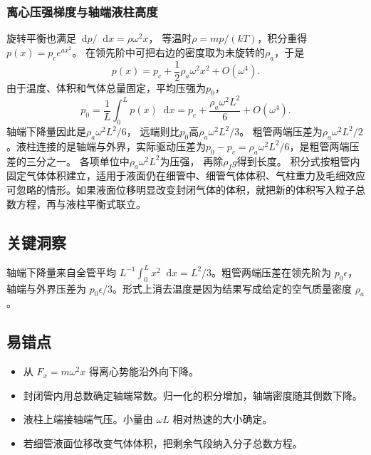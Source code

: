 \documentclass[UTF8,fontset=fandol,a4paper,11pt]{ctexart}
\newcommand{\dd}{\mathop{}\!\mathrm{d}}
\begin{document}
\subsubsection*{离心压强梯度与轴端液柱高度}
旋转平衡也满足$\dd p/\dd x=\rho\omega^2x$，
等温时$\rho=mp/(kT)$，积分重得$p(x)=p_c e^{ax^2}$。
在领先阶中可把右边的密度取为未旋转的$\rho_a$，于是
\[
p(x)=p_c+\frac12\rho_a\omega^2x^2+O(\omega^4).
\]
由于温度、体积和气体总量固定，平均压强为$p_0$，
\[
p_0=\frac1L\int_0^Lp(x)\dd x
=p_c+\frac{\rho_a\omega^2L^2}{6}+O(\omega^4).
\]
轴端下降量因此是$\rho_a\omega^2L^2/6$，
远端则比$p_0$高$\rho_a\omega^2L^2/3$。
粗管两端压差为$\rho_a\omega^2L^2/2$。液柱连接的是轴端与外界，实际驱动压差为$p_0-p_c=\rho_a\omega^2L^2/6$，是粗管两端压差的三分之一。
各项单位中$\rho_a\omega^2L^2$为压强，
再除$\rho_fg$得到长度。
积分式按粗管内固定气体体积建立，适用于液面仍在细管中、细管气体体积、气柱重力及毛细效应可忽略的情形。如果液面位移明显改变封闭气体的体积，就把新的体积写入粒子总数方程，再与液柱平衡式联立。




\subsection*{关键洞察}

轴端下降量来自全管平均 $L^{-1}\int_0^L x^2\dd x=L^2/3$。粗管两端压差在领先阶为 $p_0\epsilon$，轴端与外界压差为 $p_0\epsilon/3$。形式上消去温度是因为结果写成给定的空气质量密度 $\rho_a$。



\subsection*{易错点}

\begin{itemize}
\item 从 $F_x=m\omega^2x$ 得离心势能沿外向下降。
\item 封闭管内用总数确定轴端常数。归一化的积分增加，轴端密度随其倒数下降。
\item 液柱上端接轴端气压。小量由 $\omega L$ 相对热速的大小确定。
\item 若细管液面位移改变气体体积，把剩余气段纳入分子总数方程。
\end{itemize}

\end{document}
